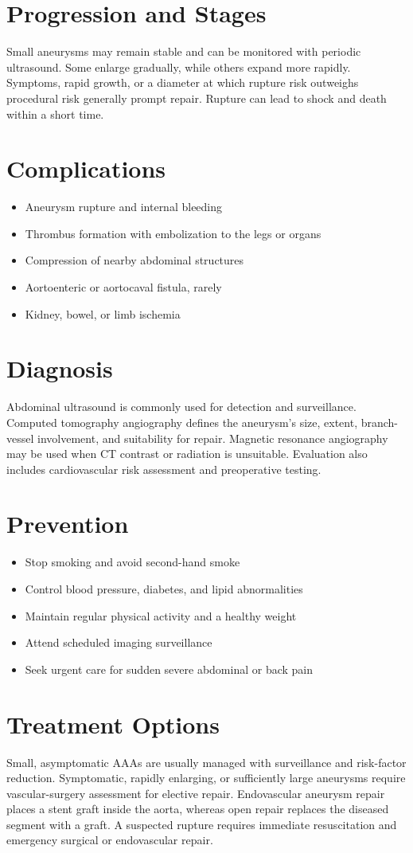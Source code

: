\section{Progression and Stages}
Small aneurysms may remain stable and can be monitored with periodic ultrasound. Some enlarge gradually, while others expand more rapidly. Symptoms, rapid growth, or a diameter at which rupture risk outweighs procedural risk generally prompt repair. Rupture can lead to shock and death within a short time.
\section{Complications}
\begin{itemize}[noitemsep]
  \item Aneurysm rupture and internal bleeding
  \item Thrombus formation with embolization to the legs or organs
  \item Compression of nearby abdominal structures
  \item Aortoenteric or aortocaval fistula, rarely
  \item Kidney, bowel, or limb ischemia
\end{itemize}
\section{Diagnosis}
Abdominal ultrasound is commonly used for detection and surveillance. Computed tomography angiography defines the aneurysm's size, extent, branch-vessel involvement, and suitability for repair. Magnetic resonance angiography may be used when CT contrast or radiation is unsuitable. Evaluation also includes cardiovascular risk assessment and preoperative testing.
\section{Prevention}
\begin{itemize}[noitemsep]
  \item Stop smoking and avoid second-hand smoke
  \item Control blood pressure, diabetes, and lipid abnormalities
  \item Maintain regular physical activity and a healthy weight
  \item Attend scheduled imaging surveillance
  \item Seek urgent care for sudden severe abdominal or back pain
\end{itemize}
\section{Treatment Options}
Small, asymptomatic AAAs are usually managed with surveillance and risk-factor reduction. Symptomatic, rapidly enlarging, or sufficiently large aneurysms require vascular-surgery assessment for elective repair. Endovascular aneurysm repair places a stent graft inside the aorta, whereas open repair replaces the diseased segment with a graft. A suspected rupture requires immediate resuscitation and emergency surgical or endovascular repair.

